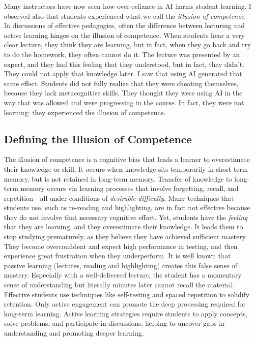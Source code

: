 \documentclass{tufte-handout}
\begin{document}
Many instructors have now seen how over-reliance in AI harms student learning. I observed also that students experienced what we call the \emph{illusion of competence}.\cite{koriat2005illusions} In discussions of effective pedagogies, often the difference between lecturing and active learning hinges on the illusion of competence. When students hear a very clear lecture, they think they are learning, but in fact, when they go back and try to do the homework, they often cannot do it. The lecture was presented by an expert, and they had this feeling that they understood, but in fact, they didn't. They could not apply that knowledge later. I saw that using AI generated that same effect. Students did not fully realize that they were cheating themselves, because they lack metacognitive skills. They thought they were using AI in the way that was allowed and were progressing in the course. In fact, they were not learning: they experienced the illusion of competence.

\subsection{Defining the Illusion of Competence}

The illusion of competence is a cognitive bias that leads a learner to overestimate their knowledge or skill. It occurs when knowledge sits temporarily in short-term memory, but is not retained in long-term memory. Transfer of knowledge to long-term memory occurs via learning processes that involve forgetting, recall, and repetition---all under conditions of \emph{desirable difficulty}. Many techniques that students use, such as re-reading and highlighting, are in fact not effective because they do not involve that necessary cognitive effort. Yet, students have the \emph{feeling} that they are learning, and they overestimate their knowledge. It leads them to stop studying prematurely, as they believe they have achieved sufficient mastery. They become overconfident and expect high performance in testing, and then experience great frustration when they underperform.
It is well known that passive learning (lectures, reading and highlighting) creates this false sense of mastery. Especially with a well-delivered lecture, the student has a momentary sense of understanding but literally minutes later cannot recall the material. Effective students use techniques like self-testing and spaced repetition to solidify retention. Only active engagement can promote the deep processing required for long-term learning. Active learning strategies require students to apply concepts, solve problems, and participate in discussions, helping to uncover gaps in understanding and promoting deeper learning.
\end{document}
